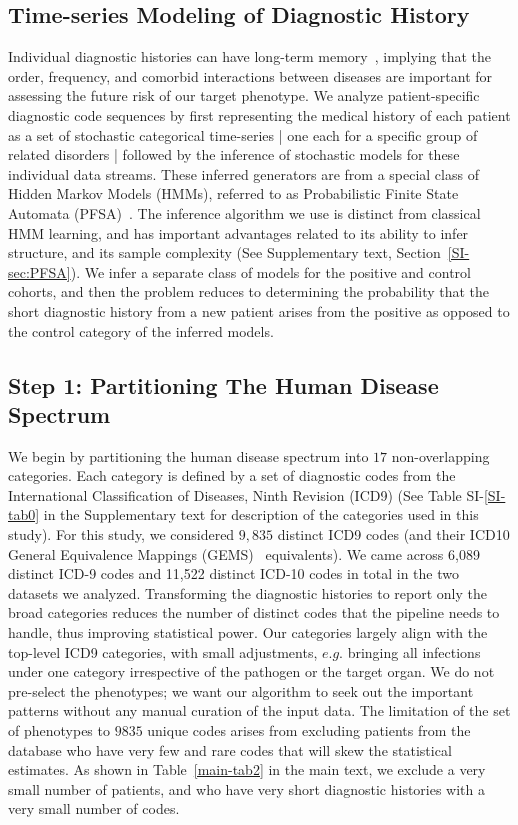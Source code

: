 \documentclass[onecolumn,,10pt]{IEEEtran}
\gdef\treatment{positive\xspace}
\begin{document}
\subsection{Time-series Modeling of  Diagnostic History}
Individual diagnostic histories  can have long-term memory~\cite{ltgranger80}, implying that the order, frequency, and comorbid interactions between diseases are   important for assessing the future risk of our target phenotype. 
We analyze  patient-specific  diagnostic code sequences by first  representing the medical history of each patient as a set of stochastic categorical time-series | one each for a specific group of related disorders |  followed by the inference of stochastic models  for  these individual data streams. These inferred generators are from a special class of  Hidden Markov Models (HMMs), referred to as Probabilistic Finite State Automata (PFSA)~\cite{CL12g}. The inference algorithm we use is distinct from classical HMM learning, and has important advantages related to its ability to infer structure, and its sample complexity (See Supplementary text, Section~\ref{SI-sec:PFSA}). We infer a separate class of models for the \treatment and control cohorts, and then the problem reduces to determining the probability that the short diagnostic history from a  new  patient arises from the \treatment as opposed to the control category of the inferred models. 
\subsection{Step 1: Partitioning The Human Disease Spectrum}
We begin by partitioning the human disease spectrum into  $17$ non-overlapping  categories. Each category is defined by a set of diagnostic codes from the International Classification of Diseases, Ninth Revision (ICD9) (See  Table SI-\ref{SI-tab0} in the Supplementary text for description of  the categories used in this study). For this study, we considered $9,835$ distinct ICD9 codes (and their ICD10 General Equivalence Mappings (GEMS)~\cite{GEMS} equivalents). We came across 6,089 distinct ICD-9 codes and 11,522 distinct ICD-10 codes in total in the two datasets we analyzed. Transforming the diagnostic histories to report only the broad categories   reduces the number of distinct codes that the pipeline needs to handle, thus improving statistical  power.   
Our categories largely align with the top-level ICD9 categories, with small 
adjustments, $e.g.$ bringing all infections under one category irrespective of the pathogen or the target organ.
We do not pre-select the phenotypes; we want our algorithm to seek out the important patterns without any manual curation of the input data. The limitation of the set of phenotypes to $9835$ unique codes arises from excluding patients from the database who have very few and rare codes that will skew the statistical estimates. As shown in Table~\ref{main-tab2} in the main text, we exclude a very small number of patients, and who have  very short diagnostic histories with a very small number of codes.
\end{document}
